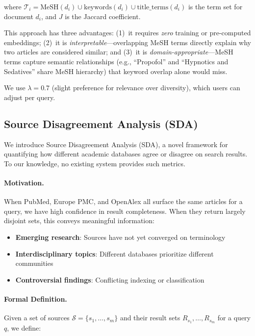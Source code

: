 \documentclass[11pt,a4paper]{article}
\begin{document}
where $\mathcal{T}_i = \text{MeSH}(d_i) \cup \text{keywords}(d_i) \cup \text{title\_terms}(d_i)$ is the term set for document $d_i$, and $J$ is the Jaccard coefficient.

This approach has three advantages:
(1)~it requires \emph{zero} training or pre-computed embeddings;
(2)~it is \emph{interpretable}---overlapping MeSH terms directly explain why two articles are considered similar;
and (3)~it is \emph{domain-appropriate}---MeSH terms capture semantic relationships (e.g., ``Propofol'' and ``Hypnotics and Sedatives'' share MeSH hierarchy) that keyword overlap alone would miss.

We use $\lambda = 0.7$ (slight preference for relevance over diversity), which users can adjust per query.

\subsection{Source Disagreement Analysis (SDA)}
\label{sec:sda}

We introduce Source Disagreement Analysis (SDA), a novel framework for quantifying how different academic databases agree or disagree on search results.
To our knowledge, no existing system provides such metrics.

\paragraph{Motivation.}
When PubMed, Europe PMC, and OpenAlex all surface the same articles for a query, we have high confidence in result completeness.
When they return largely disjoint sets, this conveys meaningful information:
\begin{itemize}
    \item \textbf{Emerging research}: Sources have not yet converged on terminology
    \item \textbf{Interdisciplinary topics}: Different databases prioritize different communities
    \item \textbf{Controversial findings}: Conflicting indexing or classification
\end{itemize}

\paragraph{Formal Definition.}
Given a set of sources $\mathcal{S} = \{s_1, \ldots, s_m\}$ and their result sets $R_{s_1}, \ldots, R_{s_m}$ for a query $q$, we define:
\end{document}
